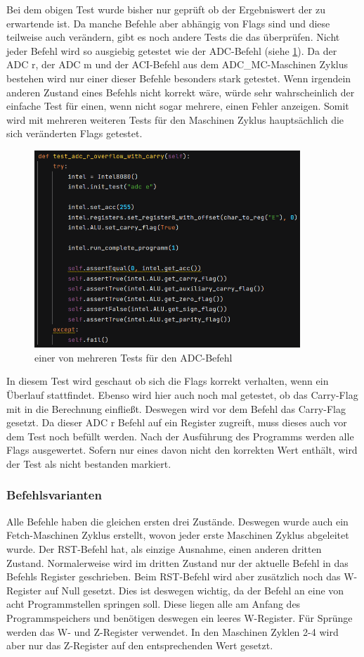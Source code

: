 \documentclass[12pt]{article}
\newcommand{\imgSpaceBefore}{\vspace{10pt}}
\begin{document}
\noindent
Bei dem obigen Test wurde bisher nur geprüft ob der Ergebniswert der zu erwartende ist. Da manche Befehle aber abhängig von Flags sind und diese teilweise auch verändern, gibt es noch andere Tests die das überprüfen. Nicht jeder Befehl wird so ausgiebig getestet wie der ADC-Befehl (siehe \ref{fig:test_adc}). Da der ADC r, der ADC m und der ACI-Befehl aus dem ADC\_MC-Maschinen Zyklus bestehen wird nur einer dieser Befehle besonders stark getestet. Wenn irgendein anderen Zustand eines Befehls nicht korrekt wäre, würde sehr wahrscheinlich der einfache Test für einen, wenn nicht sogar mehrere, einen Fehler anzeigen. Somit wird mit mehreren weiteren Tests für den Maschinen Zyklus hauptsächlich die sich veränderten Flags getestet.

\imgSpaceBefore
\begin{figure}[H]
\centering
\includegraphics[width=10cm]{bilder/test_adc}
\caption{einer von mehreren Tests für den ADC-Befehl}
\label{fig:test_adc}
\end{figure}

\noindent
In diesem Test wird geschaut ob sich die Flags korrekt verhalten, wenn ein Überlauf stattfindet. Ebenso wird hier auch noch mal getestet, ob das Carry-Flag mit in die Berechnung einfließt. Deswegen wird vor dem Befehl das Carry-Flag gesetzt. Da dieser ADC r Befehl auf ein Register zugreift, muss dieses auch vor dem Test noch befüllt werden. Nach der Ausführung des Programms werden alle Flags ausgewertet. Sofern nur eines davon nicht den korrekten Wert enthält, wird der Test als nicht bestanden markiert.


\subsubsection{Befehlsvarianten}
Alle Befehle haben die gleichen ersten drei Zustände. Deswegen wurde auch ein Fetch-Maschinen Zyklus erstellt, wovon jeder erste Maschinen Zyklus abgeleitet wurde. Der RST-Befehl hat, als einzige Ausnahme, einen anderen dritten Zustand. Normalerweise wird im dritten Zustand nur der aktuelle Befehl in das Befehls Register geschrieben. Beim RST-Befehl wird aber zusätzlich noch das W-Register auf Null gesetzt. Dies ist deswegen wichtig, da der Befehl an eine von acht Programmstellen springen soll. Diese liegen alle am Anfang des Programmspeichers und benötigen deswegen ein leeres W-Register. Für Sprünge werden das W- und Z-Register verwendet. In den Maschinen Zyklen 2-4 wird aber nur das Z-Register auf den entsprechenden Wert gesetzt.
\\
\end{document}
